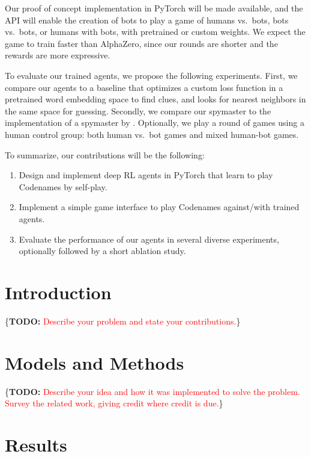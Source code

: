 \documentclass{article}
\newcommand{\TODO}[1]{\{\textbf{TODO: }\textcolor{red}{#1}\}}
\begin{document}
Our proof of concept implementation in PyTorch will be made available, and the API will enable the creation of bots to play a game of humans vs.~bots, bots vs.~bots, or humans with bots, with pretrained or custom weights. We expect the game to train faster than AlphaZero, since our rounds are shorter and the rewards are more expressive.

To evaluate our trained agents, we propose the following experiments. First, we compare our agents to a baseline that optimizes a custom loss function in a pretrained word embedding space to find clues, and looks for nearest neighbors in the same space for guessing. Secondly, we compare our spymaster to the implementation of a spymaster by \cite{codenamesai}. Optionally, we play a round of games using a human control group: both human vs.~bot games and mixed human-bot games.

To summarize, our contributions will be the following:
\begin{enumerate}
    \item Design and implement deep RL agents in PyTorch that learn to play Codenames by self-play.
    \item Implement a simple game interface to play Codenames against/with trained agents.
    \item Evaluate the performance of our agents in several diverse experiments, optionally followed by a short ablation study.
\end{enumerate}





\section{Introduction}

\TODO{Describe your problem and state your contributions.}







\section{Models and Methods}

\TODO{Describe your idea and how it was implemented to solve the problem. Survey the related work, giving credit where credit is due.}





\section{Results}
\end{document}
